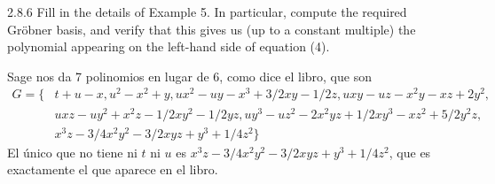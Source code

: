 \documentclass[twoside]{article}
\begin{document}
\newpage

\begin{ejercicio}{2.8.6}
Fill in the details of Example 5. In particular, compute the required Gröbner basis, and
verify that this gives us (up to a constant multiple) the polynomial appearing on the
left-hand side of equation (4).
\end{ejercicio}
\begin{solucion}
Sage nos da 7 polinomios en lugar de 6, como dice el libro, que son
\begin{align*}
G=\{&t + u - x, u^2 - x^2 + y, ux^2 - uy - x^3 + 3/2xy - 1/2z, uxy - uz - x^2y - xz + 2y^2,\\
&uxz - uy^2 + x^2z - 1/2xy^2 - 1/2yz,
uy^3 - uz^2 - 2x^2yz + 1/2xy^3 - xz^2 + 5/2y^2z,\\
&x^3z - 3/4x^2y^2 - 3/2xyz + y^3 + 1/4z^2\}
\end{align*}
El único que no tiene ni $t$ ni $u$ es $x^3z - 3/4x^2y^2 - 3/2xyz + y^3 + 1/4z^2$, que es exactamente el que aparece en el libro.
\end{solucion}

\newpage
\end{document}
